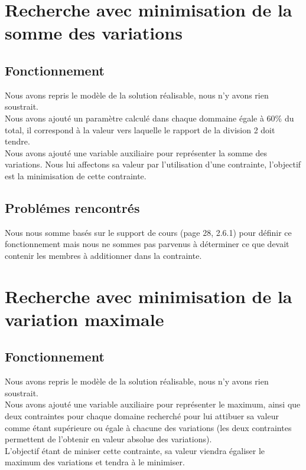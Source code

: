 \documentclass[a4paper,12pt,oneside]{report}
\begin{document}
\chapter{Recherche avec minimisation de la somme des variations}

\section{Fonctionnement}

Nous avons repris le modèle de la solution réalisable, nous n'y avons rien soustrait.\\
Nous avons ajouté un paramètre calculé dans chaque dommaine égale à 60\% du total, il correspond à la valeur vers laquelle le rapport de la division 2 doit tendre.\\
Nous avons ajouté une variable auxiliaire pour représenter la somme des variations. Nous lui affectons sa valeur par l'utilisation d'une contrainte, l'objectif est la minimisation de cette contrainte.\\

\section{Problémes rencontrés}
Nous nous somme basés sur le support de cours (page 28, 2.6.1) pour définir ce fonctionnement mais nous ne sommes pas parvenus à déterminer ce que devait
contenir les membres à additionner dans la contrainte.

\chapter{Recherche avec minimisation de la variation maximale}

\section{Fonctionnement}

Nous avons repris le modèle de la solution réalisable, nous n'y avons rien soustrait.\\
Nous avons ajouté une variable auxiliaire pour représenter le maximum, ainsi que deux contraintes pour chaque domaine recherché pour lui attibuer
sa valeur comme étant supérieure ou égale à chacune des variations (les deux contraintes permettent de l'obtenir en valeur absolue des variations).\\
L'objectif étant de miniser cette contrainte, sa valeur viendra égaliser le maximum des variations et tendra à le minimiser.\\
\end{document}
